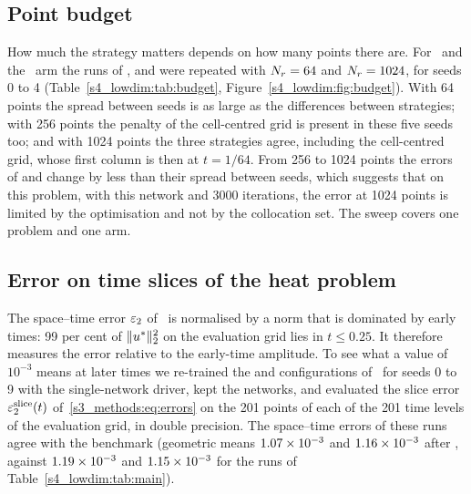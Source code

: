 \subsection{Point budget}\label{s4_lowdim:sec:budget}

How much the strategy matters depends on how many points there are. For \PH\ and the
\AdamLBFGS\ arm the runs of ,  and  were repeated
with $N_{r}=64$ and $N_{r}=1024$, for seeds 0 to 4 (Table~\ref{s4_lowdim:tab:budget},
Figure~\ref{s4_lowdim:fig:budget}). With 64 points the spread between seeds is as large as
the differences between strategies; with 256 points the penalty of the cell-centred grid is
present in these five seeds too; and with 1024 points the three strategies agree, including
the cell-centred grid, whose first column is then at $t=1/64$. From 256 to 1024 points the
errors of  and  change by less than their spread between seeds,
which suggests that on this problem, with this network and 3000 iterations, the error at
1024 points is limited by the optimisation and not by the collocation set. The sweep covers
one problem and one arm.

\subsection{Error on time slices of the heat problem}\label{s4_lowdim:sec:timeslice}

The space--time error $\varepsilon_{2}$ of \PH\ is normalised by a norm that is dominated by early
times: 99 per cent of $\lVert u^{*}\rVert_2^2$ on the evaluation grid lies in $t\le0.25$. It
therefore measures the error relative to the early-time amplitude. To see what a value of
$10^{-3}$ means at later times we re-trained the  and 
configurations of \PH\ for seeds 0 to 9 with the single-network driver, kept the networks,
and evaluated the slice error $\varepsilon_{2}^{\mathrm{slice}}(t)$ of~\eqref{s3_methods:eq:errors} on the 201 points of
each of the 201 time levels of the evaluation grid, in double precision.
The space--time errors of these runs agree with the benchmark (geometric means
$1.07\times 10^{-3}$ and $1.16\times 10^{-3}$ after \AdamLBFGS, against $1.19\times 10^{-3}$ and
$1.15\times 10^{-3}$ for the runs of Table~\ref{s4_lowdim:tab:main}).


